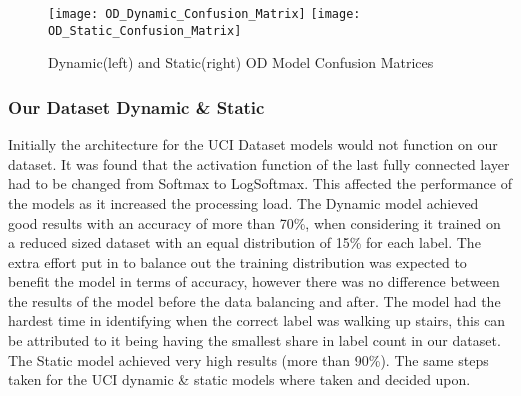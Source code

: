 \begin{figure}[H]
\centering
\texttt{[image: OD\_Dynamic\_Confusion\_Matrix]}\hfill
\texttt{[image: OD\_Static\_Confusion\_Matrix]}\hfill
\caption{Dynamic(left) and Static(right) OD Model Confusion Matrices}
\label{fig:OD_Confusions}
\end{figure}

\subsubsection{Our Dataset Dynamic \& Static}
Initially the architecture for the UCI Dataset models would not function on our dataset.
It was found that the activation function of the last fully connected layer had to be changed from Softmax to LogSoftmax.
This affected the performance of the models as it increased the processing load.
The Dynamic model achieved good results with an accuracy of more than 70\%, when considering it trained on a reduced sized dataset with an equal distribution of 15\% for each label.
The extra effort put in to balance out the training distribution was expected to benefit the model in terms of accuracy, however there was no difference between the results of the model before the data balancing and after.
The model had the hardest time in identifying when the correct label was walking up stairs, this can be attributed to it being having the smallest share in label count in our dataset.
The Static model achieved very high results (more than 90\%).
The same steps taken for the UCI dynamic \& static models where taken and decided upon.



